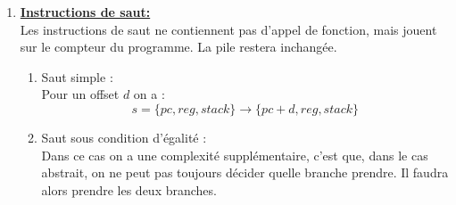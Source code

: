 \documentclass[a4paper,french, 12pt]{article}
\begin{document}
\begin{enumerate}
\begin{enumerate}
			\item ET binaire :\\
			Pour les nombres tristates :
			$$ t_1 \wedge t_2 = (t_1.v \wedge t_2.v,(t_1.v \wedge t_1.m) \lor (t_1.m \wedge t_1.v))$$
			Pour les intervalles :\\
			Idem que pour le OU
			$$ I_1 = [a,b], t_1, I_2 = [x,y], t_2 $$
			$$ t_3 = t_1 \wedge t_2 $$
			$$ I_1 \wedge I_2 = (t_3.v, min(b,y))$$

		
			\item Affectation :\\
			Dans les deux cas on affecte juste la valeur.\\

		\end{enumerate}
		\item \textbf{\underline{Instructions de saut:}}\\
		Les instructions de saut ne contiennent pas d'appel de fonction, mais jouent sur le compteur du programme. 
		La pile restera inchangée.
		\begin{enumerate}
			\item Saut simple :\\
			Pour un offset $d$ on a :
			$$ s = \{pc, reg , stack\} \to \{pc + d, reg, stack\} $$
			\item Saut sous condition d'égalité :\\
			Dans ce cas on a une complexité supplémentaire, c'est que, dans le cas abstrait, on ne peut pas toujours décider quelle branche prendre. Il faudra alors prendre les deux branches.
			\begin{center}
\end{center}
\end{enumerate}
\end{enumerate}
\end{document}
